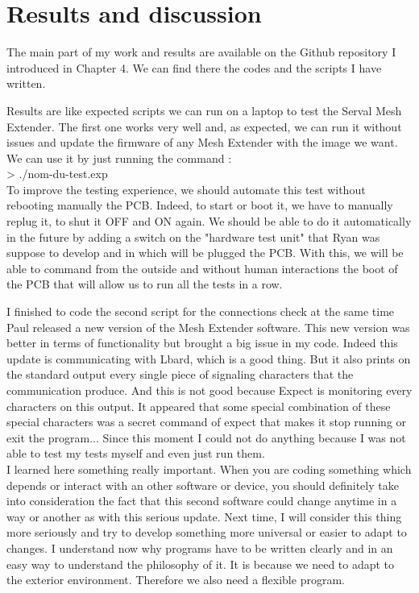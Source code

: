\chapter{Results and discussion}

The main part of my work and results are available on the Github repository I introduced in Chapter 4. We can find there the codes and the scripts I have written.
\par
Results are like expected scripts we can run on a laptop to test the Serval Mesh Extender. The first one works very well and, as expected, we can run it without issues and update the firmware of any Mesh Extender with the image we want. We can use it by just running the command :
\\ > ./nom-du-test.exp \\
To improve the testing experience, we should automate this test without rebooting manually the PCB. Indeed, to start or boot it, we have to manually replug it, to shut it OFF and ON again. We should be able to do it automatically in the future by adding a switch on the "hardware test unit" that Ryan was suppose to develop and in which will be plugged the PCB. With this, we will be able to command from the outside and without human interactions the boot of the PCB that will allow us to run all the tests in a row. 

\par
I finished to code the second script for the connections check at the same time Paul released a new version of the Mesh Extender software. This new version was better in terms of functionality but brought a big issue in my code. Indeed this update is communicating with Lbard, which is a good thing. But it also prints on the standard output every single piece of signaling characters that the communication produce. And this is not good because Expect is monitoring every characters on this output. It appeared that some special combination of these special characters was a secret command of expect that makes it stop running or exit the program... Since this moment I could not do anything because I was not able to test my tests myself and even just run them. 
\\
I learned here something really important. When you are coding something which depends or interact with an other software or device, you should definitely take into consideration the fact that this second software could change anytime in a way or another as with this serious update. Next time, I will consider this thing more seriously and try to develop something more universal or easier to adapt to changes. I understand now why programs have to be written clearly and in an easy way to understand the philosophy of it. It is because we need to adapt to the exterior environment. Therefore we also need a flexible program. 

